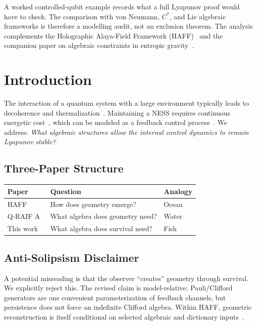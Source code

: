 \documentclass[12pt,a4paper,openany]{book}
\begin{document}
A worked controlled-qubit example records what a full Lyapunov proof
would have to check.  The comparison with von Neumann, $C^*$, and Lie
algebraic frameworks is therefore a modelling audit, not an exclusion
theorem.
The analysis complements the Holographic Alaya-Field Framework (HAFF)~\cite{Liu2026PaperA,Liu2026PaperB} and the companion paper on algebraic constraints in entropic gravity~\cite{Liu2026QRAIF_A}.




\section{Introduction}
\label{Q-B-sec:intro}

The interaction of a quantum system with a large environment typically leads to decoherence and thermalization~\cite{Breuer2002,Weiss2012}.
Maintaining a NESS requires continuous energetic cost~\cite{Seifert2012,Jarzynski2011}, which can be modeled as a feedback control process~\cite{Sagawa2012,Parrondo2015}.
We address: \textit{What algebraic structures allow the internal control dynamics to remain Lyapunov stable?}

\subsection{Three-Paper Structure}

\begin{center}
\begin{tabular}{@{}lll@{}}
\toprule
\textbf{Paper} & \textbf{Question} & \textbf{Analogy} \\
\midrule
HAFF~\cite{Liu2026PaperA} & How does geometry emerge? & Ocean \\
Q-RAIF A~\cite{Liu2026QRAIF_A} & What algebra does geometry need? & Water \\
This work & What algebra does survival need? & Fish \\
\bottomrule
\end{tabular}
\end{center}

\subsection{Anti-Solipsism Disclaimer}

A potential misreading is that the observer ``creates'' geometry through survival.
We explicitly reject this.
The revised claim is model-relative: Pauli/Clifford generators are one convenient parameterization of feedback channels, but persistence does not force an indefinite Clifford algebra.  Within HAFF, geometric reconstruction is itself conditional on selected algebraic and dictionary inputs~\cite{Liu2026PaperB}.
\end{document}
